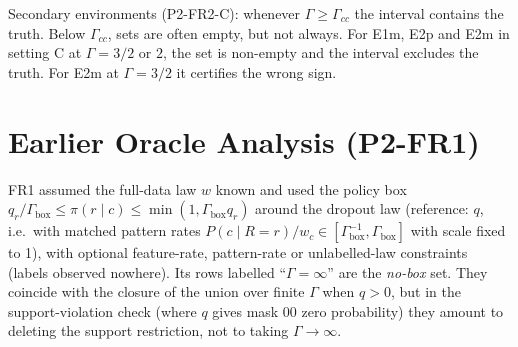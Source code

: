 \documentclass{article}
\theoremstyle{plain}
\theoremstyle{definition}
\theoremstyle{remark}
\begin{document}
\begin{table}[h]
\centering\small
\caption{Identification criterion audit on FR1 feasible sets (P2-FR2-G).}
\label{tab:audit}

\end{table}

\begin{table}[h]
\centering\small
\caption{Structural zero: one cell never fully observed (P2-FR2-E).}
\label{tab:support}

\end{table}

Secondary environments (P2-FR2-C): whenever $\Gamma\ge\Gamma_{cc}$ the interval
contains the truth. Below $\Gamma_{cc}$, sets are often empty, but not always.
For E1m, E2p and E2m in setting C at $\Gamma=3/2$ or $2$, the set is
non-empty and the interval excludes the truth. For E2m at $\Gamma=3/2$ it
certifies the wrong sign.

\section{Earlier Oracle Analysis (P2-FR1)}
\label{app:fr1}

FR1 assumed the full-data law $w$ known and used the policy box
$q_r/\Gamma_{\mathrm{box}}\le\pi(r\mid c)\le\min(1,\Gamma_{\mathrm{box}} q_r)$ around the dropout law
(reference: $q$, i.e.\ with matched pattern rates $P(c\mid R=r)/w_c\in[\Gamma_{\mathrm{box}}^{-1},\Gamma_{\mathrm{box}}]$ with scale fixed to 1), with
optional feature-rate, pattern-rate or unlabelled-law constraints (labels
observed nowhere). Its rows labelled ``$\Gamma=\infty$'' are the
\emph{no-box} set. They coincide with the closure of the union over finite
$\Gamma$ when $q>0$, but in the support-violation check (where $q$ gives
mask 00 zero probability) they amount to deleting the support restriction,
not to taking $\Gamma\to\infty$.

\begin{table}[h]
\centering\small
\caption{FR1: joint versus separate interval and a hand-specified scenario
grid, pattern-rate constraint (P2-FR1-B). ``A'' means A better and ``?''
means undetermined.}

\end{table}

\begin{table}[h]
\centering\small
\caption{FR1: ranking-transfer threshold $\Gamma^*_{\mathrm{box}}$ (smallest $\Gamma_{\mathrm{box}}$ whose
interval contains 0) by information set, and the closed-form lower bound
(P2-FR1-E).}

\end{table}
\end{document}
